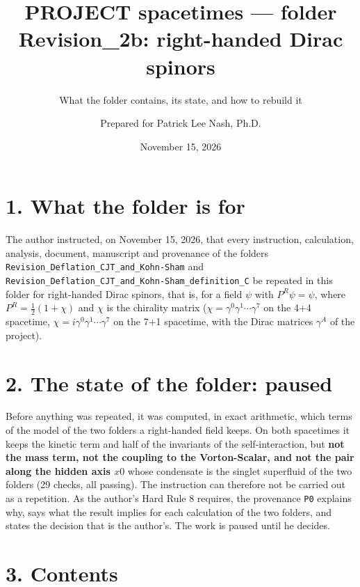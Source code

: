 \documentclass[
  10pt,
]{article}
\title{PROJECT spacetimes --- folder Revision\_2b: right-handed Dirac
spinors}
\subtitle{What the folder contains, its state, and how to rebuild it}
\author{Prepared for Patrick Lee Nash, Ph.D.}
\date{November 15, 2026}
\begin{document}
\maketitle

\hypertarget{what-the-folder-is-for}{%
\section{1. What the folder is for}\label{what-the-folder-is-for}}

The author instructed, on November 15, 2026, that every instruction,
calculation, analysis, document, manuscript and provenance of the
folders \texttt{Revision\_Deflation\_CJT\_and\_Kohn-Sham} and
\texttt{Revision\_Deflation\_CJT\_and\_Kohn-Sham\_definition\_C} be
repeated in this folder for right-handed Dirac spinors, that is, for a
field \(\psi\) with \(P^R\psi=\psi\), where \(P^R=\tfrac12(1+\chi)\) and
\(\chi\) is the chirality matrix
(\(\chi=\gamma^{0}\gamma^{1}\cdots\gamma^{7}\) on the 4+4 spacetime,
\(\chi=i\gamma^{0}\gamma^{1}\cdots\gamma^{7}\) on the 7+1 spacetime,
with the Dirac matrices \(\gamma^A\) of the project).

\hypertarget{the-state-of-the-folder-paused}{%
\section{2. The state of the folder:
paused}\label{the-state-of-the-folder-paused}}

Before anything was repeated, it was computed, in exact arithmetic,
which terms of the model of the two folders a right-handed field keeps.
On both spacetimes it keeps the kinetic term and half of the invariants
of the self-interaction, but \textbf{not the mass term, not the coupling
to the Vorton-Scalar, and not the pair along the hidden axis \(x0\)}
whose condensate is the singlet superfluid of the two folders (29
checks, all passing). The instruction can therefore not be carried out
as a repetition. As the author's Hard Rule 8 requires, the provenance
\texttt{P0} explains why, says what the result implies for each
calculation of the two folders, and states the decision that is the
author's. The work is paused until he decides.

\hypertarget{contents}{%
\section{3. Contents}\label{contents}}
\end{document}
